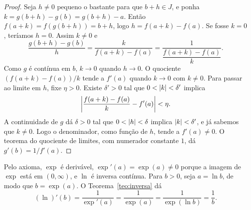 \documentclass[11pt,a4paper]{article}
\begin{document}
\begin{proof}
Seja $h\neq 0$ pequeno o bastante para que $b+h\in J$, e ponha $k=g(b+h)-g(b)=g(b+h)-a$. Ent\~ao $f(a+k)=f(g(b+h))=b+h$, logo $h=f(a+k)-f(a)$. Se fosse $k=0$, ter\'iamos $h=0$. Assim $k\neq 0$ e
\[
\frac{g(b+h)-g(b)}{h}=\frac{k}{f(a+k)-f(a)}=\frac{1}{\dfrac{f(a+k)-f(a)}{k}}.
\]
Como $g$ \'e cont\'inua em $b$, $k\to 0$ quando $h\to 0$. O quociente $(f(a+k)-f(a))/k$ tende a $f'(a)$ quando $k\to 0$ com $k\neq 0$. Para passar ao limite em $h$, fixe $\eta>0$. Existe $\delta'>0$ tal que $0<\left\lvert k \right\rvert<\delta'$ implica
\[
\left\lvert \frac{f(a+k)-f(a)}{k}-f'(a) \right\rvert<\eta.
\]
A continuidade de $g$ d\'a $\delta>0$ tal que $0<\left\lvert h \right\rvert<\delta$ implica $\left\lvert k \right\rvert<\delta'$, e j\'a sabemos que $k\neq 0$. Logo o denominador, como fun\c{c}\~ao de $h$, tende a $f'(a)\neq 0$. O teorema do quociente de limites, com numerador constante $1$, d\'a $g'(b)=1/f'(a)$.
\end{proof}

\begin{exemplo}[Logaritmo]
\label{ex:ln}
Pelo axioma, $\exp$ \'e deriv\'avel, $\exp'(a)=\exp(a)\neq 0$ porque a imagem de $\exp$ est\'a em $(0,\infty)$, e $\ln$ \'e inversa cont\'inua. Para $b>0$, seja $a=\ln b$, de modo que $b=\exp(a)$. O Teorema~\ref{teo:inversa} d\'a
\[
(\ln)'(b)=\frac{1}{\exp'(a)}=\frac{1}{\exp(a)}=\frac{1}{\exp(\ln b)}=\frac{1}{b}.
\]
\end{exemplo}
\end{document}
